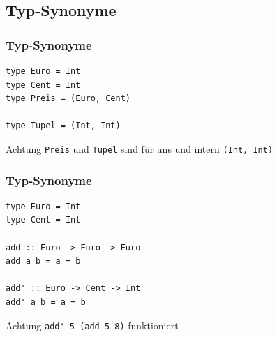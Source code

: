 \subsection{Typ-Synonyme}

\begin{frame}[fragile]
\frametitle{Typ-Synonyme} 
\begin{lstlisting}
type Euro = Int
type Cent = Int
type Preis = (Euro, Cent)

type Tupel = (Int, Int)
\end{lstlisting}
\begin{alertblock}{Achtung}
\lstinline|Preis| und \lstinline|Tupel| sind für uns und intern \lstinline|(Int, Int)|
\end{alertblock}
\end{frame}

\begin{frame}[fragile]
\frametitle{Typ-Synonyme} 
\begin{lstlisting}
type Euro = Int
type Cent = Int

add :: Euro -> Euro -> Euro
add a b = a + b

add' :: Euro -> Cent -> Int
add' a b = a + b
\end{lstlisting}
\begin{alertblock}{Achtung}
\lstinline|add' 5 (add 5 8)| funktioniert
\end{alertblock}
\end{frame}

